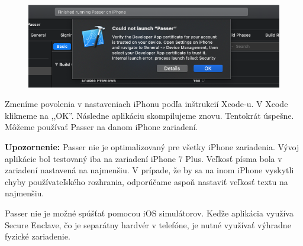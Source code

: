 \begin{figure}[H]
  \centering
  \includegraphics[width=13cm]{img/tutorial8.png}
  \label{tutorial8}
\end{figure}

\noindent Zmeníme povolenia v nastaveniach iPhonu podľa inštrukcií Xcode-u. V Xcode klikneme na ,,OK''. Následne aplikáciu skompilujeme znovu. Tentokrát úspešne. Môžeme používať Passer na danom iPhone zariadení. \newline

\textbf{Upozornenie:} Passer nie je optimalizovaný pre všetky iPhone zariadenia. Vývoj aplikácie bol testovaný iba na zariadení iPhone 7 Plus. Veľkosť písma bola v zariadení nastavená na najmenšiu. V prípade, že by sa na inom iPhone vyskytli chyby používateľského rozhrania, odporúčame aspoň nastaviť veľkosť textu na najmenšiu.

Passer nie je možné spúšťať pomocou iOS simulátorov. Keďže aplikácia využíva Secure Enclave, čo je separátny hardvér v telefóne, je nutné využívať výhradne fyzické zariadenie.